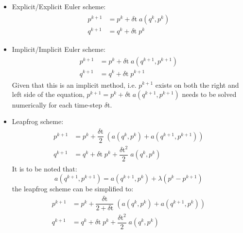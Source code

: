 \begin{itemize}
    \item Explicit/Explicit Euler scheme:
    \begin{gather}\begin{aligned}
        p^{k+1} &= p^k + \delta\text{t} \; a(q^k,p^k) \\
        q^{k+1} &= q^k + \delta\text{t} \; p^k 
    \end{aligned}
    \label{eq:explicit_euler}
    \end{gather}
    \item Implicit/Implicit Euler scheme:
    \begin{gather}
        \begin{aligned}
        p^{k+1} &= p^k + \delta\text{t} \; a(q^{k+1},p^{k+1}) \\
        q^{k+1} &= q^k + \delta\text{t} \; p^{k+1}
    \end{aligned}
    \label{eq:impliict_euler}
    \end{gather}
    Given that this is an implicit method, i.e. $p^{k+1}$ exists on both the right and left side of the equation, $p^{k+1} = p^k + \delta\text{t} \; a(q^{k+1},p^{k+1})$ needs to be solved numerically for each time-step $\delta$t. 
    \item Leapfrog scheme:
    \begin{gather*}\begin{aligned}
        p^{k+1} &= p^k + \dfrac{\delta\text{t}}{2} \; \left(a(q^{k},p^{k})+a(q^{k+1},p^{k+1})\right) \\
        q^{k+1} &= q^k + \delta\text{t} \; p^k + \dfrac{\delta\text{t}^2}{2} \; a(q^{k},p^{k}) 
    \end{aligned}\end{gather*}
    It is to be noted that:
    \begin{equation}
        a(q^{k+1},p^{k+1}) = a(q^{k+1},p^{k}) + \lambda(p^k - p^{k+1})
        \label{eq:acc_relationship}
    \end{equation}
    the leapfrog scheme can be simplified to:
    \begin{gather}\begin{aligned}
        p^{k+1} &= p^k + \dfrac{\delta\text{t}}{2 + \delta\text{t}} \; \left(a(q^k,p^k) + a(q^{k+1},p^{k}) \right) \\
        q^{k+1} &= q^k + \delta\text{t} \; p^k + \dfrac{\delta\text{t}^2}{2} \; a(q^{k},p^{k})
        \label{eq:leapfrog}
    \end{aligned}\end{gather}
\end{itemize}



